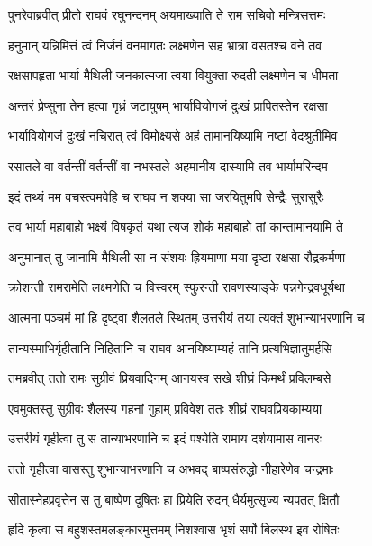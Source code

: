 
\twolineshloka
{पुनरेवाब्रवीत् प्रीतो राघवं रघुनन्दनम्}
{अयमाख्याति ते राम सचिवो मन्त्रिसत्तमः} %

\twolineshloka
{हनुमान् यन्निमित्तं त्वं निर्जनं वनमागतः}
{लक्ष्मणेन सह भ्रात्रा वसतश्च वने तव} %

\twolineshloka
{रक्षसापहृता भार्या मैथिली जनकात्मजा}
{त्वया वियुक्ता रुदती लक्ष्मणेन च धीमता} %

\twolineshloka
{अन्तरं प्रेप्सुना तेन हत्वा गृध्रं जटायुषम्}
{भार्यावियोगजं दुःखं प्रापितस्तेन रक्षसा} %

\twolineshloka
{भार्यावियोगजं दुःखं नचिरात् त्वं विमोक्ष्यसे}
{अहं तामानयिष्यामि नष्टां वेदश्रुतीमिव} %

\twolineshloka
{रसातले वा वर्तन्तीं वर्तन्तीं वा नभस्तले}
{अहमानीय दास्यामि तव भार्यामरिन्दम} %

\twolineshloka
{इदं तथ्यं मम वचस्त्वमवेहि च राघव}
{न शक्या सा जरयितुमपि सेन्द्रैः सुरासुरैः} %

\twolineshloka
{तव भार्या महाबाहो भक्ष्यं विषकृतं यथा}
{त्यज शोकं महाबाहो तां कान्तामानयामि ते} %

\twolineshloka
{अनुमानात् तु जानामि मैथिली सा न संशयः}
{ह्रियमाणा मया दृष्टा रक्षसा रौद्रकर्मणा} %

\twolineshloka
{क्रोशन्ती रामरामेति लक्ष्मणेति च विस्वरम्}
{स्फुरन्ती रावणस्याङ्के पन्नगेन्द्रवधूर्यथा} %

\twolineshloka
{आत्मना पञ्चमं मां हि दृष्ट्वा शैलतले स्थितम्}
{उत्तरीयं तया त्यक्तं शुभान्याभरणानि च} %

\twolineshloka
{तान्यस्माभिर्गृहीतानि निहितानि च राघव}
{आनयिष्याम्यहं तानि प्रत्यभिज्ञातुमर्हसि} %

\twolineshloka
{तमब्रवीत् ततो रामः सुग्रीवं प्रियवादिनम्}
{आनयस्व सखे शीघ्रं किमर्थं प्रविलम्बसे} %

\twolineshloka
{एवमुक्तस्तु सुग्रीवः शैलस्य गहनां गुहाम्}
{प्रविवेश ततः शीघ्रं राघवप्रियकाम्यया} %

\twolineshloka
{उत्तरीयं गृहीत्वा तु स तान्याभरणानि च}
{इदं पश्येति रामाय दर्शयामास वानरः} %

\twolineshloka
{ततो गृहीत्वा वासस्तु शुभान्याभरणानि च}
{अभवद् बाष्पसंरुद्धो नीहारेणेव चन्द्रमाः} %

\twolineshloka
{सीतास्नेहप्रवृत्तेन स तु बाष्पेण दूषितः}
{हा प्रियेति रुदन् धैर्यमुत्सृज्य न्यपतत् क्षितौ} %

\twolineshloka
{हृदि कृत्वा स बहुशस्तमलङ्कारमुत्तमम्}
{निशश्वास भृशं सर्पो बिलस्थ इव रोषितः} %

